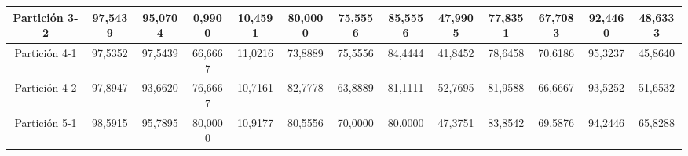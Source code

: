 \documentclass[12pt]{article}
\begin{document}
\begin{table}[H]
{\begin{tabular}{|c|cccc|cccc|cccc|}
Partición 3-2 & \multicolumn{1}{c|}{97,5439}                                                  & \multicolumn{1}{c|}{95,0704}                                                 & \multicolumn{1}{c|}{0,9900}  & 10,4591 & \multicolumn{1}{c|}{80,0000}                                                  & \multicolumn{1}{c|}{75,5556}                                                 & \multicolumn{1}{c|}{85,5556} & 47,9905 & \multicolumn{1}{c|}{77,8351}                                                  & \multicolumn{1}{c|}{67,7083}                                                 & \multicolumn{1}{c|}{92,4460} & 48,6333 \\ \hline
Partición 4-1 & \multicolumn{1}{c|}{97,5352}                                                  & \multicolumn{1}{c|}{97,5439}                                                 & \multicolumn{1}{c|}{66,6667} & 11,0216 & \multicolumn{1}{c|}{73,8889}                                                  & \multicolumn{1}{c|}{75,5556}                                                 & \multicolumn{1}{c|}{84,4444} & 41,8452 & \multicolumn{1}{c|}{78,6458}                                                  & \multicolumn{1}{c|}{70,6186}                                                 & \multicolumn{1}{c|}{95,3237} & 45,8640 \\ \hline
Partición 4-2 & \multicolumn{1}{c|}{97,8947}                                                  & \multicolumn{1}{c|}{93,6620}                                                 & \multicolumn{1}{c|}{76,6667} & 10,7161 & \multicolumn{1}{c|}{82,7778}                                                  & \multicolumn{1}{c|}{63,8889}                                                 & \multicolumn{1}{c|}{81,1111} & 52,7695 & \multicolumn{1}{c|}{81,9588}                                                  & \multicolumn{1}{c|}{66,6667}                                                 & \multicolumn{1}{c|}{93,5252} & 51,6532 \\ \hline
Partición 5-1 & \multicolumn{1}{c|}{98,5915}                                                  & \multicolumn{1}{c|}{95,7895}                                                 & \multicolumn{1}{c|}{80,0000} & 10,9177 & \multicolumn{1}{c|}{80,5556}                                                  & \multicolumn{1}{c|}{70,0000}                                                 & \multicolumn{1}{c|}{80,0000} & 47,3751 & \multicolumn{1}{c|}{83,8542}                                                  & \multicolumn{1}{c|}{69,5876}                                                 & \multicolumn{1}{c|}{94,2446} & 65,8288 \\ \hline

\end{tabular}}
\end{table}
\end{document}
